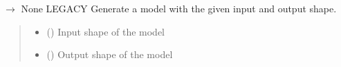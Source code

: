 \documentclass[letterpaper,10pt,english]{sphinxmanual}
\begin{document}
\begin{fulllineitems}
\label{\detokenize{autoapi/src/LSTMTrainer/index:src.LSTMTrainer.__model_generator}}
\pysigstartsignatures
\pysiglinewithargsret
{}
{\sphinxparamcomma {}}
{{ $\rightarrow$ None}}
\pysigstopsignatures
\sphinxAtStartPar
LEGACY \sphinxhyphen{} Generate a model with the given input and output shape.
\begin{quote}\begin{description}
\begin{itemize}
\item {} 
\sphinxAtStartPar
{} (\sphinxstyleliteralemphasis{\sphinxupquote{{[}}}\sphinxstyleliteralemphasis{\sphinxupquote{, }}\sphinxstyleliteralemphasis{\sphinxupquote{{]}}}) \textendash{} Input shape of the model

\item {} 
\sphinxAtStartPar
{} () \textendash{} Output shape of the model

\end{itemize}

\end{description}\end{quote}

\end{fulllineitems}

\end{document}
